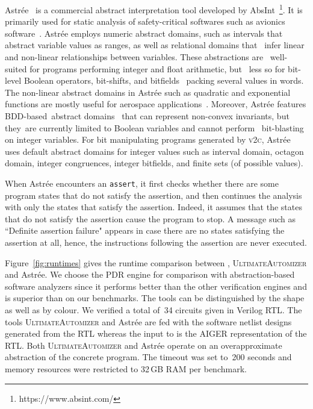 Astr{\'e}e~\cite{DBLP:conf/esop/CousotCFMMMR05} is a commercial abstract 
interpretation tool developed by AbsInt~\footnote{https://www.absint.com/}.  
It is primarily used for static analysis of safety-critical softwares 
such as avionics software~\cite{DBLP:journals/corr/abs-cs-0701193}.
Astr{\'e}e employs numeric abstract domains, such as intervals that  
abstract variable values as ranges, as well as relational domains that  
infer linear and non-linear relationships between variables. These abstractions are  
well-suited for programs performing integer and float arithmetic, but  
less so for bit-level Boolean operators, bit-shifts, and bitfields  
packing several values in words.  The non-linear abstract domains in 
Astr{\'e}e such as quadratic and exponential functions are mostly useful 
for aerospace applications~\cite{DBLP:journals/ftpl/BertraneCCFMMR15}.  
Moreover, Astr{\'e}e features BDD-based abstract 
domains~\cite{bdd-domain} that can represent non-convex invariants, 
but they are currently limited to Boolean variables and cannot perform  
bit-blasting on integer variables.  For bit manipulating programs 
generated by \textsc{v2c}, Astr{\'e}e uses default abstract domains 
for integer values such as interval domain, octagon domain, integer 
congruences, integer bitfields, and finite sets (of possible values).


When Astr{\'e}e encounters an \texttt{assert}, it first checks whether 
there are some program states that do not satisfy the assertion, and 
then continues the analysis with only the states that satisfy the assertion. 
Indeed, it assumes that the states that do not satisfy the assertion cause 
the program to stop.  A message such as ``Definite assertion failure" appears 
in case there are no states satisfying the assertion at all, hence, the 
instructions following the assertion are never executed.


Figure~\ref{fig:runtimes} gives the runtime comparison between 
\ABC, \textsc{UltimateAutomizer} and Astr{\'e}e.  We choose 
the \ABC PDR engine for comparison with abstraction-based software 
analyzers since it performs better than the other verification engines 
and is superior than \ebmc on our benchmarks. The tools can be distinguished 
by the shape as well as by colour. 
%
We verified a total of~34 circuits given in Verilog RTL. 
The tools \textsc{UltimateAutomizer} and Astr{\'e}e are fed with the 
software netlist designs generated from the RTL whereas the input to 
\ABC is the AIGER representation of the RTL. 
% 
Both \textsc{UltimateAutomizer} and Astr{\'e}e operate 
on an overapproximate abstraction of the concrete program.  
The timeout was set to~200 seconds and memory resources 
were restricted to 32\,GB RAM per benchmark. 


